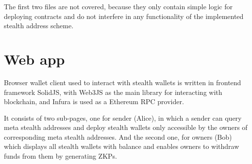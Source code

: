 \begin{table}[ht]
\centering
{}
\caption{Solidity code coverage}
\label{table:coverage}
\end{table}

The first two files are not covered, because they only contain simple logic
for deploying contracts and do not interfere in any functionality of the
implemented stealth address scheme.

\section{Web app}

Browser wallet client used to interact with stealth wallets is written in
frontend framework SolidJS\cite{solidjs}, with Web3JS\cite{web3js}
as the main library for interacting with blockchain, and Infura\cite{infura}
is used as a Ethereum RPC provider.

It consists of two sub-pages, one for sender (Alice), in which a sender
can query meta stealth addresses and deploy stealth wallets only accessible
by the owners of corresponding meta stealth addresses. And the second one,
for owners (Bob) which displays all stealth wallets with balance and enables
owners to withdraw funds from them by generating ZKPs.

